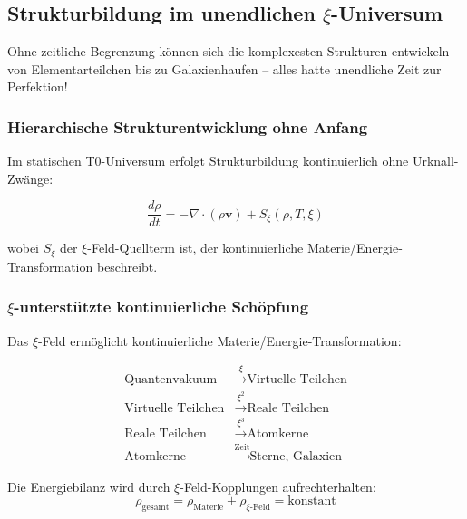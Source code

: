 \documentclass[12pt,a4paper]{article}
\theoremstyle{definition}
\begin{document}
	\subsection{Strukturbildung im unendlichen $\xi$-Universum}
	
	\begin{revolutionary}
		Ohne zeitliche Begrenzung können sich die komplexesten Strukturen entwickeln -- von Elementarteilchen bis zu Galaxienhaufen -- alles hatte unendliche Zeit zur Perfektion!
	\end{revolutionary}
	
	\subsubsection{Hierarchische Strukturentwicklung ohne Anfang}
	
	Im statischen T0-Universum erfolgt Strukturbildung kontinuierlich ohne Urknall-Zwänge:
	
	\begin{equation}
		\frac{d\rho}{dt} = -\nabla \cdot (\rho \mathbf{v}) + S_{\xi}(\rho, T, \xi)
	\end{equation}
	
	wobei $S_{\xi}$ der $\xi$-Feld-Quellterm ist, der kontinuierliche Materie/Energie-Transformation beschreibt.
	
	\subsubsection{$\xi$-unterstützte kontinuierliche Schöpfung}
	
	Das $\xi$-Feld ermöglicht kontinuierliche Materie/Energie-Transformation:
	
	\begin{align}
		\text{Quantenvakuum} &\xrightarrow{\xi} \text{Virtuelle Teilchen} \nonumber \\
		\text{Virtuelle Teilchen} &\xrightarrow{\xi^2} \text{Reale Teilchen} \nonumber \\
		\text{Reale Teilchen} &\xrightarrow{\xi^3} \text{Atomkerne} \nonumber \\
		\text{Atomkerne} &\xrightarrow{\text{Zeit}} \text{Sterne, Galaxien} \nonumber
	\end{align}
	
	Die Energiebilanz wird durch $\xi$-Feld-Kopplungen aufrechterhalten:
	\begin{equation}
		\rho_{\text{gesamt}} = \rho_{\text{Materie}} + \rho_{\xi\text{-Feld}} = \text{konstant}
	\end{equation}
	
\end{document}

